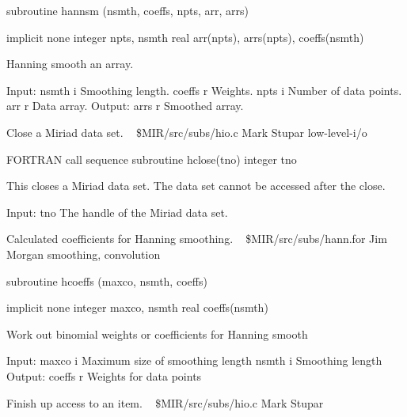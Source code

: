 \par{\tenpoint
{\eightpoint\begintt
      subroutine hannsm (nsmth, coeffs, npts, arr, arrs)

      implicit none
      integer npts, nsmth
      real arr(npts), arrs(npts), coeffs(nsmth)

  Hanning smooth an array.

  Input:
    nsmth    i    Smoothing length.
    coeffs   r    Weights.
    npts     i    Number of data points.
    arr      r    Data array.
  Output:
    arrs     r    Smoothed array.
\endtt}
\par}
%
\noindent Close a Miriad data set.
\newline \ 
\newline {} \$MIR/src/subs/hio.c
\newline {} Mark Stupar
\newline {} low-level-i/o
\par{\tenpoint
{\eightpoint\begintt
FORTRAN call sequence
        subroutine hclose(tno)
        integer tno

  This closes a Miriad data set. The data set cannot be accessed after the
  close.

  Input:
    tno         The handle of the Miriad data set.                      
\endtt}
\par}
%
\noindent Calculated coefficients for Hanning smoothing.
\newline \ 
\newline {} \$MIR/src/subs/hann.for
\newline {} Jim Morgan
\newline \abox{Keywords:} smoothing, convolution
\par{\tenpoint
{\eightpoint\begintt
      subroutine hcoeffs (maxco, nsmth, coeffs)

      implicit none
      integer maxco, nsmth
      real coeffs(nsmth)

  Work out binomial weights or coefficients for Hanning smooth

  Input:
    maxco   i    Maximum size of smoothing length
    nsmth   i    Smoothing length
  Output:
    coeffs  r    Weights for data points
\endtt}
\par}
%
\noindent Finish up access to an item.
\newline \ 
\newline {} \$MIR/src/subs/hio.c
\newline \abox{Responsible:} Mark Stupar
